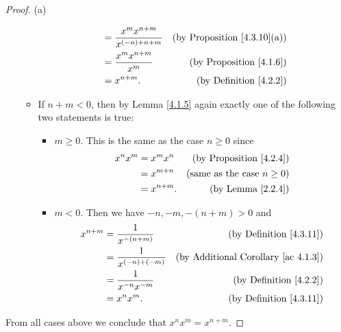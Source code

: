 \begin{proof}{(a)}
\begin{itemize}
\begin{itemize}
\begin{align*}
                                    & = \frac{x^m x^{n + m}}{x^{(-n) + n + m}} & \text{(by Proposition \ref{4.3.10}(a))} \\
                                    & = \frac{x^m x^{n + m}}{x^m}              & \text{(by Proposition \ref{4.1.6})}     \\
                                    & = x^{n + m}.                             & \text{(by Definition \ref{4.2.2})}
                        \end{align*}
                  \item If \(n + m < 0\), then by Lemma \ref{4.1.5} again exactly one of the following two statements is true:
                        \begin{itemize}
                            \item \(m \geq 0\).
                                  This is the same as the case \(n \geq 0\) since
                                  \begin{align*}
                                      x^n x^m & = x^m x^n    & \text{(by Proposition \ref{4.2.4})}    \\
                                              & = x^{m + n}  & \text{(same as the case \(n \geq 0\))} \\
                                              & = x^{n + m}. & \text{(by Lemma \ref{2.2.4})}
                                  \end{align*}
                            \item \(m < 0\).
                                  Then we have \(-n, -m, -(n + m) > 0\) and
                                  \begin{align*}
                                      x^{n + m} & = \frac{1}{x^{-(n + m)}}    & \text{(by Definition \ref{4.3.11})}             \\
                                                & = \frac{1}{x^{(-n) + (-m)}} & \text{(by Additional Corollary \ref{ac 4.1.3})} \\
                                                & = \frac{1}{x^{-n} x^{-m}}   & \text{(by Definition \ref{4.2.2})}              \\
                                                & = x^n x^m.                  & \text{(by Definition \ref{4.3.11})}
                                  \end{align*}
                        \end{itemize}
              \end{itemize}
    \end{itemize}
    From all cases above we conclude that \(x^n x^m = x^{n + m}\).


\end{proof}
